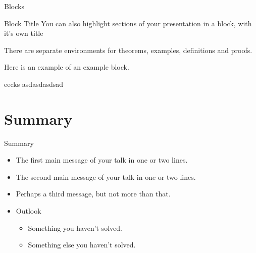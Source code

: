 \documentclass{beamer}
\begin{document}
              \begin{frame}{Blocks}
                \begin{block}{Block Title}
                  You can also highlight sections of your presentation in a block, with it's own title
                \end{block}
                \begin{theorem}
                  There are separate environments for theorems, examples, definitions and proofs.
                \end{theorem}
                \begin{example}
                  Here is an example of an example block.
                \end{example}
                \begin{beamercolorbox}[wd=7cm]{eecks}
                  asdasdasdsad
                \end{beamercolorbox}
              \end{frame}
                                          																						
              \section*{Summary}
                                          																						
              \begin{frame}{Summary}
                \begin{itemize}
                  \item
                    The \alert{first main message} of your talk in one or two lines.
                  \item
                    The \alert{second main message} of your talk in one or two lines.
                  \item
                    Perhaps a \alert{third message}, but not more than that.
                \end{itemize}
                                                																									
                \begin{itemize}
                  \item
                    Outlook
                    \begin{itemize}
                      \item
                        Something you haven't solved.
                      \item
                        Something else you haven't solved.
                    \end{itemize}
                \end{itemize}
              \end{frame}
                                          																						
\end{document}
